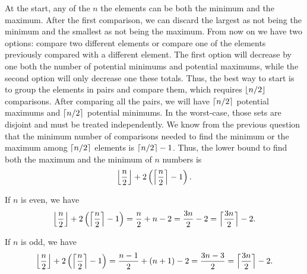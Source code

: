 \begin{enumerate}
\begin{framed}
At the start, any of the $n$ the elements can be both the minimum and the
maximum. After the first comparison, we can discard the largest as not being the
minimum and the smallest as not being the maximum. From now on we have two
options: compare two different elements or compare one of the elements
previously compared with a different element. The first option will decrease by
one both the number of potential minimums and potential maximums, while the
second option will only decrease one these totals. Thus, the best way to start
is to group the elements in pairs and compare them, which requires $\lfloor n/2\rfloor$
comparisons. After comparing all the pairs, we will have $\lceil n/2\rceil$ potential
maximums and $\lceil n/2\rceil$ potential minimums. In the worst-case, those sets are
disjoint and must be treated independently. We know from the previous question
that the minimum number of comparisons needed to find the minimum or the maximum
among $\lceil n/2\rceil$ elements is $\lceil n/2\rceil - 1$. Thus, the lower bound to find
both the maximum and the minimum of $n$ numbers is
\[
  \Bigl\lfloor \frac{n}{2} \Bigr\rfloor + 2 \left( \Bigl\lceil \frac{n}{2} \Bigr\rceil - 1 \right).
\]

If $n$ is even, we have
\[
  \Bigl\lfloor \frac{n}{2} \Bigr\rfloor + 2 \left( \Bigl\lceil \frac{n}{2} \Bigr\rceil - 1 \right)
  = \frac{n}{2} + n - 2
  = \frac{3n}{2} - 2
  = \Bigl\lceil \frac{3n}{2} \Bigr\rceil - 2.
\]

If $n$ is odd, we have
\[
  \Bigl\lfloor \frac{n}{2} \Bigr\rfloor + 2 \left( \Bigl\lceil \frac{n}{2} \Bigr\rceil - 1 \right)
  = \frac{n - 1}{2} + (n + 1) - 2
  = \frac{3n - 3}{2}
  = \Bigl\lceil \frac{3n}{2} \Bigr\rceil - 2.
\]
\end{framed}

\end{enumerate}
